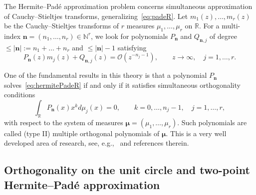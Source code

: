 \documentclass[reqno,centertags,11pt,draft]{amsart}
\newcommand{\R}{\mathbb{R}}
\newcommand{\N}{\mathbb{N}}
\begin{document}
The Hermite--Pad\'{e} approximation problem concerns simultaneous approximation of Cauchy--Stieltjes transforms, generalizing~\eqref{eq:padeR}. %
Let $m_1(z), \ldots, m_r(z)$ be the Cauchy--Stieltjes transforms of $r$ measures $\mu_1, \ldots, \mu_r$ on $\R$. For a multi-index $\bm{n} = (n_1, \ldots, n_r) \in \N^r$, we look for polynomials $P_{\bm{n}}$ and $Q_{\bm{n},j}$  of degree $\le |\bm{n}|:=n_1+\ldots+n_r$ and $\le |\bm{n}|-1$ satisfying
\begin{equation}\label{eq:hermitePadeR}
P_{\bm{n}}(z) m_j(z) + Q_{\bm{n},j}(z) = \mathcal{O}(z^{-n_j - 1}),
\qquad z \to \infty, \quad j = 1,\ldots,r.
\end{equation}

One of the fundamental results in this theory is that a polynomial $P_{\bm{n}}$ %
solves~\eqref{eq:hermitePadeR} if and only if it satisfies simultaneous orthogonality conditions 
\begin{equation}\label{eq:MOPRL}
    \int_\R P_{\bm{n}}(x) x^{k}  d\mu_j(x) = 0,
    \qquad k = 0,\ldots,n_j-1, \quad j = 1,\ldots,r,
\end{equation}
with respect to the system of measures 
$\bm{\mu}=(\mu_1,\ldots,\mu_r)$. Such polynomials are called (type II) multiple orthogonal polynomials of $\bm\mu$.
This is a very well developed area of research, see, e.g.,~\cites{Aptekarev, Ismail, Applications,Nikishin} and references therein.

\subsection{Orthogonality on the unit circle and two-point Hermite--Pad\'{e} approximation}\label{ss:intro2}
\hfill\\
\end{document}
